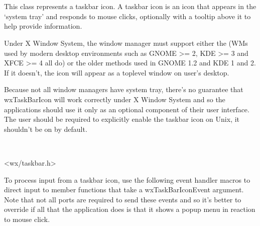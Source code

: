 \section{}\label{wxtaskbaricon}

This class represents a taskbar icon. A taskbar icon is an icon that appears in the `system tray' and responds to mouse clicks, optionally with a tooltip above it to help provide information.


Under X Window System, the window manager must support either
the 
(WMs used by modern desktop environments such as GNOME >= 2, KDE
>= 3 and XFCE >= 4 all do) or the older methods used in GNOME 1.2 and
KDE 1 and 2. If it doesn't, the icon will appear as a toplevel window on
user's desktop.

Because not all window managers have system tray, there's no guarantee that
wxTaskBarIcon will work correctly under X Window System and so the applications
should use it only as an optional component of their user interface. The user
should be required to explicitly enable the taskbar icon on Unix, it shouldn't
be on by default.



\\


<wx/taskbar.h>


To process input from a taskbar icon, use the following event handler macros to direct input to member
functions that take a wxTaskBarIconEvent argument. Note that not all ports are
required to send these events and so it's better to override
 if all that
the application does is that it shows a popup menu in reaction to mouse click.

\twocolwidtha{7cm}
\begin{twocollist}\itemsep=0pt
\end{twocollist}%


